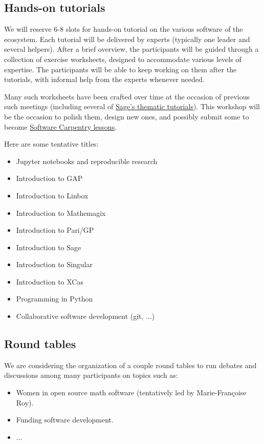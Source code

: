 \documentclass[12pt]{amsbook}
\begin{document}
\subsection{Hands-on tutorials}

We will reserve 6-8 slots for hands-on tutorial on the various
software of the ecosystem. Each tutorial will be delivered by experts
(typically one leader and several helpers). After a brief overview,
the participants will be guided through a collection of exercise
worksheets, designed to accommodate various levels of expertise.  The
participants will be able to keep working on them after the tutorials,
with informal help from the experts whenever needed.

Many such worksheets have been crafted over time at the occasion of
previous such meetings (including several of
\href{http://doc.sagemath.org/html/en/thematic_tutorials/}{Sage's
  thematic tutorials}). This workshop will be the occasion to polish them,
design new ones, and possibly submit some to become
\href{http://software-carpentry.org/lessons/}{Software Carpentry lessons}.

Here are some tentative titles:
\begin{itemize}
\item Jupyter notebooks and reproducible research
\item Introduction to GAP
\item Introduction to Linbox
\item Introduction to Mathemagix
\item Introduction to Pari/GP
\item Introduction to Sage
\item Introduction to Singular
\item Introduction to XCas
\item Programming in Python
\item Collaborative software development (git, ...)
\end{itemize}

\subsection{Round tables}

We are considering the organization of a couple round tables to run
debates and discussions among many participants on topics such as:

\begin{itemize}
\item Women in open source math software (tentatively led by Marie-Françoise Roy).
\item Funding software development.
\item ...
\end{itemize}
\end{document}
